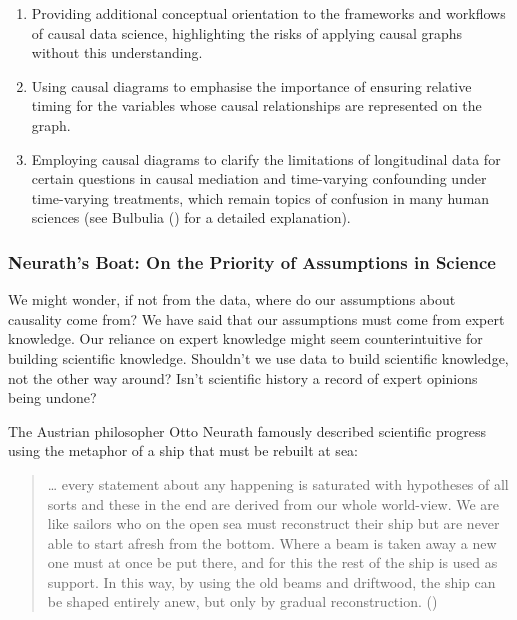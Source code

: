 \documentclass[
  single column]{article}
\providecommand{\tightlist}{%
  \setlength{\itemsep}{0pt}\setlength{\parskip}{0pt}}\usepackage{longtable,booktabs,array}
\begin{document}
\begin{enumerate}
\def\labelenumi{\arabic{enumi}.}
\tightlist
\item
  Providing additional conceptual orientation to the frameworks and
  workflows of causal data science, highlighting the risks of applying
  causal graphs without this understanding.
\item
  Using causal diagrams to emphasise the importance of ensuring relative
  timing for the variables whose causal relationships are represented on
  the graph.
\item
  Employing causal diagrams to clarify the limitations of longitudinal
  data for certain questions in causal mediation and time-varying
  confounding under time-varying treatments, which remain topics of
  confusion in many human sciences (see Bulbulia
  () for a detailed
  explanation).
\end{enumerate}

\subsubsection{Neurath's Boat: On the Priority of Assumptions in
Science}\label{neuraths-boat-on-the-priority-of-assumptions-in-science}

We might wonder, if not from the data, where do our assumptions about
causality come from? We have said that our assumptions must come from
expert knowledge. Our reliance on expert knowledge might seem
counterintuitive for building scientific knowledge. Shouldn't we use
data to build scientific knowledge, not the other way around? Isn't
scientific history a record of expert opinions being undone?

The Austrian philosopher Otto Neurath famously described scientific
progress using the metaphor of a ship that must be rebuilt at sea:

\begin{quote}
\ldots{} every statement about any happening is saturated with
hypotheses of all sorts and these in the end are derived from our whole
world-view. We are like sailors who on the open sea must reconstruct
their ship but are never able to start afresh from the bottom. Where a
beam is taken away a new one must at once be put there, and for this the
rest of the ship is used as support. In this way, by using the old beams
and driftwood, the ship can be shaped entirely anew, but only by gradual
reconstruction. ()
\end{quote}
\end{document}
